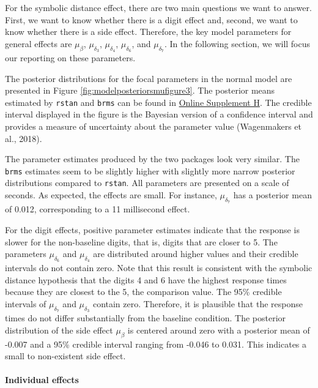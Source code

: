 \documentclass[
  english,
  doc,floatsintext]{apa6}
\let\oldparagraph\paragraph
\renewcommand{\paragraph}[1]{\oldparagraph{#1}\mbox{}}
\begin{document}
For the symbolic distance effect, there are two main questions we want to answer. First, we want to know whether there is a digit effect and, second, we want to know whether there is a side effect. Therefore, the key model parameters for general effects are \(\mu_{\beta}\), \(\mu_{\delta_{3}}\), \(\mu_{\delta_4}\), \(\mu_{\delta_6}\), and \(\mu_{\delta_{7}}\). In the following section, we will focus our reporting on these parameters.

The posterior distributions for the focal parameters in the normal model are presented in Figure \ref{fig:modelposteriorsmufigure3}. The posterior means estimated by \texttt{rstan} and \texttt{brms} can be found in \href{https://github.com/MyrtheV/Bayesian-Hierarchical-Modelling-An-Introduction-and-Reassessment/tree/main/H\%20-\%20Posterior\%20Distributions\%20Tables}{Online Supplement H}. The credible interval displayed in the figure is the Bayesian version of a confidence interval and provides a measure of uncertainty about the parameter value (Wagenmakers et al., 2018).

The parameter estimates produced by the two packages look very similar. The \texttt{brms} estimates seem to be slightly higher with slightly more narrow posterior distributions compared to \texttt{rstan}. All parameters are presented on a scale of seconds. As expected, the effects are small. For instance, \(\mu_{\delta_{7}}\) has a posterior mean of 0.012, corresponding to a 11 millisecond effect.

For the digit effects, positive parameter estimates indicate that the response is slower for the non-baseline digits, that is, digits that are closer to 5. The parameters \(\mu_{\delta_{6}}\) and \(\mu_{\delta_{4}}\) are distributed around higher values and their credible intervals do not contain zero. Note that this result is consistent with the symbolic distance hypothesis that the digits 4 and 6 have the highest response times because they are closest to the 5, the comparison value. The 95\% credible intervals of \(\mu_{\delta_{7}}\) and \(\mu_{\delta_{3}}\) contain zero. Therefore, it is plausible that the response times do not differ substantially from the baseline condition. The posterior distribution of the side effect \(\mu_{\beta}\) is centered around zero with a posterior mean of -0.007 and a 95\% credible interval ranging from -0.046 to 0.031. This indicates a small to non-existent side effect.

\hypertarget{individual-effects}{%
\paragraph{Individual effects}\label{individual-effects}}
\end{document}
